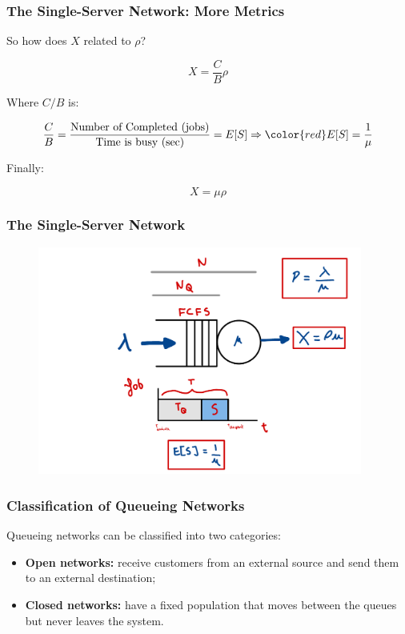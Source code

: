 \begin{frame}
    \frametitle{The Single-Server Network: More Metrics}

    So how does $X$ related to $\rho$?

    $$X = \frac{C}{B}\rho$$

    Where $C/B$ is:

    $$\frac{C}{B} = \frac{\text{Number of Completed (jobs)}}{\text{Time is busy (sec)}} 
    = E[S] \Rightarrow {\color{red}E[S] = \frac{1}{\mu}}$$

    Finally:

    $$X = \mu \rho$$
   
\end{frame}



\begin{frame}
    \frametitle{The Single-Server Network}

    \begin{figure}
        \centering
        \includegraphics[width=0.95\textwidth]{slides/figures/simple_queue_example.pdf}
    \end{figure}

\end{frame}



\begin{frame}
    \frametitle{Classification of Queueing Networks}

    Queueing networks can be classified into two categories:

    \begin{itemize}
       \item \textbf{Open networks:} receive customers from an external
       source and send them to an external destination;

       \item \textbf{Closed networks:} have a fixed population that moves between 
       the queues but never leaves the system.
    \end{itemize}

\end{frame}




